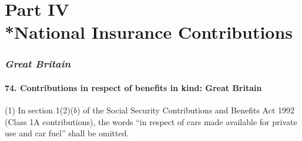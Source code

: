 \documentclass[12pt,a4paper]{article}
\begin{document}
\part[Part IV --- National Insurance Contributions]{Part IV\\*National Insurance Contributions}

\renewcommand\parthead{--- Part IV}

\section{\itshape Great Britain}

\subsection{74. Contributions in respect of benefits in kind: Great Britain}

(1) In section 1(2)($b$)  of the Social Security Contributions and Benefits Act 1992 (Class 1A contributions), the words “in respect of cars made available for private use and car fuel” shall be omitted.
\end{document}

